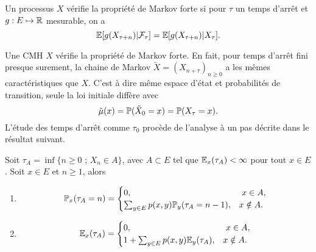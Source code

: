 \begin{definition}\label{def:markov_forte}
Un processus $X$ vérifie la propriété de Markov forte si pour $\tau$ un temps d'arrêt et $g:E\mapsto \mathbb{R}$ mesurable, on a 
$$
\mathbb{E}[g(X_{\tau + n})|\mathcal{F}_\tau]= \mathbb{E}[g(X_{\tau + n})|X_\tau].
$$
\end{definition}
Une CMH $X$ vérifie la propriété de Markov forte. En fait, pour temps d'arrêt fini presque surement, la chaine de Markov $\tilde{X}=(X_{n+\tau})_{n\geq0}$ a les mêmes caractéristiques que $X$. C'est à dire même espace d'état et probabilités de transition, seule la loi initiale diffère avec
$$
\tilde{\mu}(x) = \mathbb{P}(\tilde{X}_0 = x) = \mathbb{P}(X_\tau = x).
$$ 
L'étude des temps d'arrêt comme $\tau_0$ procède de l'analyse à un pas décrite dans le résultat suivant. 
\begin{prop}
Soit $\tau_A=\inf\{n\geq0\text{ ; }X_n\in A\}$, avec $A\subset E$ tel que $\mathbb{E}_x(\tau_A)<\infty$ pour tout $x\in E$. Soit $x\in E$ et $n\geq1$, alors
\begin{enumerate}
\item
$$
\mathbb{P}_x(\tau_A=n)=
\begin{cases}
0,&\text{ }x\in A,\\
\sum_{y\in E}p(x,y)\mathbb{P}_y(\tau_A=n-1),&x\notin A.
\end{cases}
$$
\item
$$
\mathbb{E}_x(\tau_A)=
\begin{cases}
0,&\text{ }x\in A,\\
1+\sum_{y\in E}p(x,y)\mathbb{E}_y(\tau_A),&x\notin A.
\end{cases}
$$
\end{enumerate}
\end{prop}
